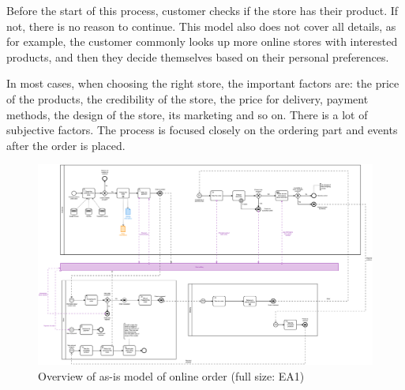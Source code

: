 \documentclass[thesis=M,english]{FITthesis}[2019/12/23]
\begin{document}
Before the start of this process, customer checks if the store has their product. If not, there is no reason to continue. This model also does not cover all details, as for example, the customer commonly looks up more online stores with interested products, and then they decide themselves based on their personal preferences. 

In most cases, when choosing the right store, the important factors are: the price of the products, the credibility of the store, the price for delivery, payment methods, the design of the store, its marketing and so on. There is a lot of subjective factors. The process is focused closely on the ordering part and events after the order is placed.


\begin{figure}[ht!]
    \centering
    \includegraphics[width=\textwidth]{assets/As-is model.png}
    \caption{Overview of as-is model of online order (full size: EA1)}
    \label{fig:AsIsOrderModel}
\end{figure}
\end{document}
